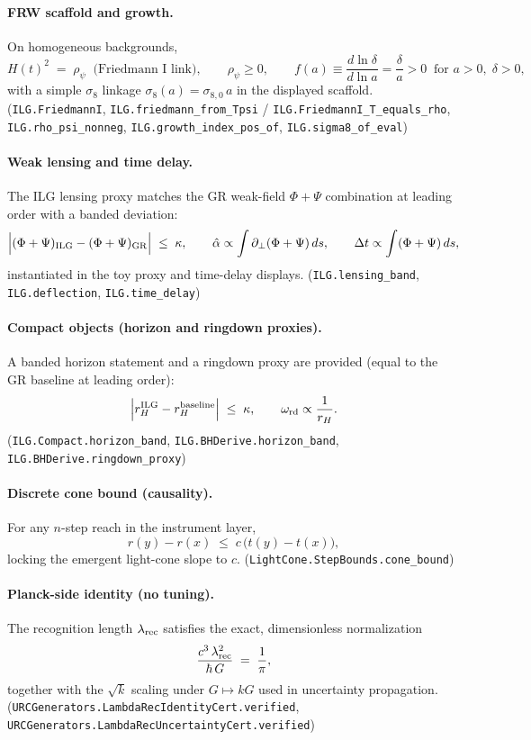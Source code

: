 \documentclass[12pt,a4paper]{article}
\begin{document}
\paragraph{FRW scaffold and growth.}
On homogeneous backgrounds,
\[
H(t)^2 \;=\; \rho_\psi \;\;\text{(Friedmann I link)},\qquad \rho_\psi \ge 0,\qquad
f(a)\equiv \frac{d\ln \delta}{d\ln a} = \frac{\delta}{a} > 0 \;\; \text{for } a>0,\;\delta>0,
\]
with a simple \(\sigma_8\) linkage \(\sigma_8(a)=\sigma_{8,0}\,a\) in the displayed scaffold. 
\hfill(\texttt{ILG.FriedmannI}, \texttt{ILG.friedmann\_from\_Tpsi} / \texttt{ILG.FriedmannI\_T\_equals\_rho}, \texttt{ILG.rho\_psi\_nonneg}, \texttt{ILG.growth\_index\_pos\_of}, \texttt{ILG.sigma8\_of\_eval})

\paragraph{Weak lensing and time delay.}
The ILG lensing proxy matches the GR weak-field \(\Phi+\Psi\) combination at leading order with a banded deviation:
\[
\Bigl|(\Phi+\Psi)_{\rm ILG} - (\Phi+\Psi)_{\rm GR}\Bigr|\;\le\;\kappa,
\qquad
\hat\alpha \propto \int \partial_\perp(\Phi+\Psi)\,ds,\qquad
\Delta t \propto \int (\Phi+\Psi)\,ds,
\]
instantiated in the toy proxy and time-delay displays. 
\hfill(\texttt{ILG.lensing\_band}, \texttt{ILG.deflection}, \texttt{ILG.time\_delay})

\paragraph{Compact objects (horizon and ringdown proxies).}
A banded horizon statement and a ringdown proxy are provided (equal to the GR baseline at leading order):
\[
\Bigl|r_{H}^{\rm ILG}-r_{H}^{\rm baseline}\Bigr|\;\le\;\kappa,
\qquad \omega_{\rm rd} \propto \frac{1}{r_H}.
\]
\hfill(\texttt{ILG.Compact.horizon\_band}, \texttt{ILG.BHDerive.horizon\_band}, \texttt{ILG.BHDerive.ringdown\_proxy})

\paragraph{Discrete cone bound (causality).}
For any \(n\)-step reach in the instrument layer,
\[
r(y)-r(x) \;\le\; c\,\bigl(t(y)-t(x)\bigr),
\]
locking the emergent light-cone slope to \(c\).
\hfill(\texttt{LightCone.StepBounds.cone\_bound})

\paragraph{Planck-side identity (no tuning).}
The recognition length \(\lambda_{\rm rec}\) satisfies the exact, dimensionless normalization
\[
\frac{c^3\,\lambda_{\rm rec}^2}{\hbar\,G} \;=\; \frac{1}{\pi},
\]
together with the \(\sqrt{k}\) scaling under \(G\mapsto kG\) used in uncertainty propagation.
\hfill(\texttt{URCGenerators.LambdaRecIdentityCert.verified}, \texttt{URCGenerators.LambdaRecUncertaintyCert.verified})
\end{document}
